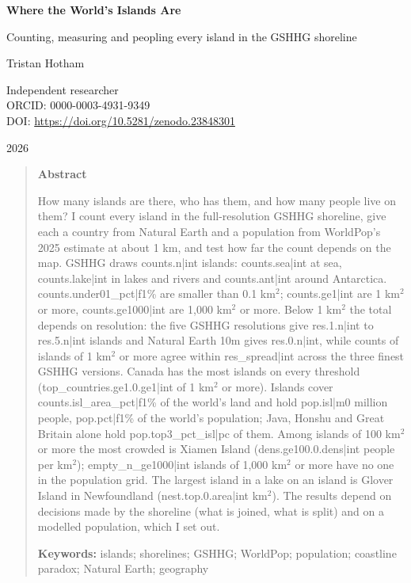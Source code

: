 \documentclass[11pt,a4paper]{article}
\begin{document}
\begin{center}
{\Large\bfseries Where the World's Islands Are\par}
\vspace{0.4em}
{\large Counting, measuring and peopling every island in the GSHHG shoreline\par}
\vspace{1.2em}
{\large Tristan Hotham\par}
\vspace{0.3em}
{\small Independent researcher\\
ORCID: 0000-0003-4931-9349\\
DOI: \href{https://doi.org/10.5281/zenodo.23848301}{https://doi.org/10.5281/zenodo.23848301}\par}
\vspace{0.8em}
2026
\end{center}

\begin{quote}
\small
\begin{center}\textbf{Abstract}\end{center}
How many islands are there, who has them, and how many people live on them? I count every island in the full-resolution GSHHG shoreline, give each a country from Natural Earth and a population from WorldPop's 2025 estimate at about 1 km, and test how far the count depends on the map. GSHHG draws {{counts.n|int}} islands: {{counts.sea|int}} at sea, {{counts.lake|int}} in lakes and rivers and {{counts.ant|int}} around Antarctica. {{counts.under01_pct|f1}}\% are smaller than 0.1 km$^2$; {{counts.ge1|int}} are 1 km$^2$ or more, {{counts.ge1000|int}} are 1,000 km$^2$ or more. Below 1 km$^2$ the total depends on resolution: the five GSHHG resolutions give {{res.1.n|int}} to {{res.5.n|int}} islands and Natural Earth 10m gives {{res.0.n|int}}, while counts of islands of 1 km$^2$ or more agree within {{res_spread|int}} across the three finest GSHHG versions. Canada has the most islands on every threshold ({{top_countries.ge1.0.ge1|int}} of 1 km$^2$ or more). Islands cover {{counts.isl_area_pct|f1}}\% of the world's land and hold {{pop.isl|m0}} million people, {{pop.pct|f1}}\% of the world's population; Java, Honshu and Great Britain alone hold {{pop.top3_pct_isl|pc}} of them. Among islands of 100 km$^2$ or more the most crowded is Xiamen Island ({{dens.ge100.0.dens|int}} people per km$^2$); {{empty_n_ge1000|int}} islands of 1,000 km$^2$ or more have no one in the population grid. The largest island in a lake on an island is Glover Island in Newfoundland ({{nest.top.0.area|int}} km$^2$). The results depend on decisions made by the shoreline (what is joined, what is split) and on a modelled population, which I set out.

\textbf{Keywords:} islands; shorelines; GSHHG; WorldPop; population; coastline paradox; Natural Earth; geography
\end{quote}
\end{document}
